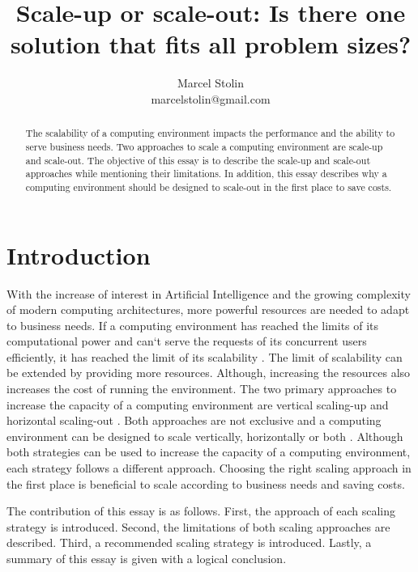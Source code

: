 \documentclass{article}
\title{Scale-up or scale-out: Is there one solution that fits all problem sizes?}
\date{}
\author{Marcel Stolin \\ marcelstolin@gmail.com}
\begin{document}
\maketitle


\begin{abstract}
The scalability of a computing environment impacts the performance and the ability to serve business needs. Two approaches to scale a computing environment are scale-up and scale-out. The objective of this essay is to describe the scale-up and scale-out approaches while mentioning their limitations. In addition, this essay describes why a computing environment should be designed to scale-out in the first place to save costs.
\end{abstract}


\section{Introduction} \label{s_intro}
With the increase of interest in Artificial Intelligence and the growing complexity of modern computing architectures, more powerful resources are needed to adapt to business needs. If a computing environment has reached the limits of its computational power and can`t serve the requests of its concurrent users efficiently, it has reached the limit of its scalability \cite{Wilder2012CloudPatterns}. The limit of scalability can be extended by providing more resources. Although, increasing the resources also increases the cost of running the environment.
The two primary approaches to increase the capacity of a computing environment are vertical scaling-up and horizontal scaling-out \cite{Abbott2015ScalabilityArt}. Both approaches are not exclusive and a computing environment can be designed to scale vertically, horizontally or both \cite{Wilder2012CloudPatterns}.
Although both strategies can be used to increase the capacity of a computing environment, each strategy follows a different approach. Choosing the right scaling approach in the first place is beneficial to  scale according to business needs and saving costs.


The contribution of this essay is as follows. First, the approach of each scaling strategy is introduced. Second, the limitations of both scaling approaches are described. Third, a recommended scaling strategy is introduced. Lastly, a summary of this essay is given with a logical conclusion.
\end{document}
